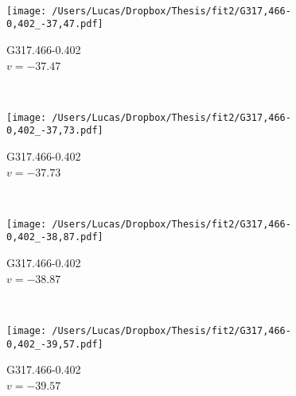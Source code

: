\begin{figure*}[t]
\begin{subfigure}[t]{0.3\textwidth}
	\end{subfigure}
	~
	\begin{subfigure}[t]{0.3\textwidth}
		\texttt{[image: /Users/Lucas/Dropbox/Thesis/fit2/G317,466-0,402\_-37,47.pdf]}
		\caption[]{G317.466-0.402\\$v=-37.47$\,\kms}
	\end{subfigure}
	~
	\begin{subfigure}[t]{0.3\textwidth}
		\texttt{[image: /Users/Lucas/Dropbox/Thesis/fit2/G317,466-0,402\_-37,73.pdf]}
		\caption[]{G317.466-0.402\\$v=-37.73$\,\kms}
	\end{subfigure}
	~
	\begin{subfigure}[t]{0.3\textwidth}
		\texttt{[image: /Users/Lucas/Dropbox/Thesis/fit2/G317,466-0,402\_-38,87.pdf]}
		\caption[]{G317.466-0.402\\$v=-38.87$\,\kms}
	\end{subfigure}
	~
	\begin{subfigure}[t]{0.3\textwidth}
		\texttt{[image: /Users/Lucas/Dropbox/Thesis/fit2/G317,466-0,402\_-39,57.pdf]}
		\caption[]{G317.466-0.402\\$v=-39.57$\,\kms}
	\end{subfigure}
	~
\end{figure*}
\clearpage
